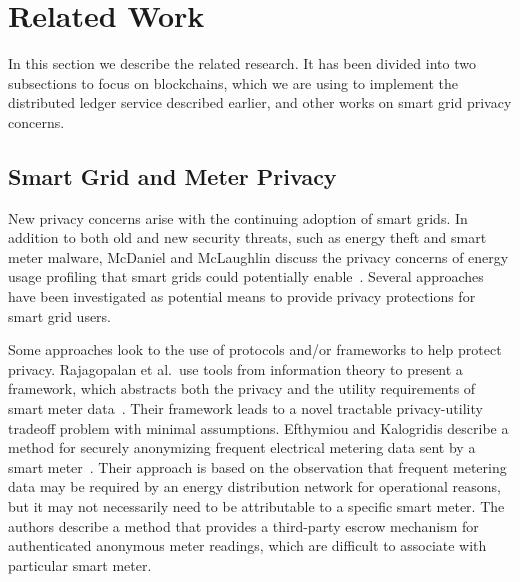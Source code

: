 \section{Related Work}
\label{sec:related}

In this section we describe the related research. It has been divided into two subsections to focus on blockchains, which we are using to implement the distributed ledger service described earlier, and other works on smart grid privacy concerns. 

\subsection{Smart Grid and Meter Privacy}
New privacy concerns arise with the continuing adoption of smart grids. In addition to both old and new security threats, such as energy theft and smart meter malware, McDaniel and McLaughlin discuss the privacy concerns of energy usage profiling that smart grids could potentially enable~\cite{mcdaniel2009security}. Several approaches have been investigated as potential means to provide privacy protections for smart grid users.

Some approaches look to the use of protocols and/or frameworks to help protect privacy. Rajagopalan et al.\ use tools from information theory to present a framework, which abstracts both the privacy and the utility requirements of smart meter data~\cite{rajagopalan2011smart,sankar2013smart}. Their framework leads to a novel tractable privacy-utility tradeoff problem with minimal assumptions. Efthymiou and Kalogridis describe a method for securely anonymizing frequent electrical metering data sent by a smart meter~\cite{efthymiou2010smart}. Their approach is based on the observation that frequent metering data may be required by an energy distribution network for operational reasons, but it may not necessarily need to be attributable to a specific smart meter. The authors describe a method that provides a third-party escrow mechanism for authenticated anonymous meter readings, which are difficult to associate with particular smart meter.

